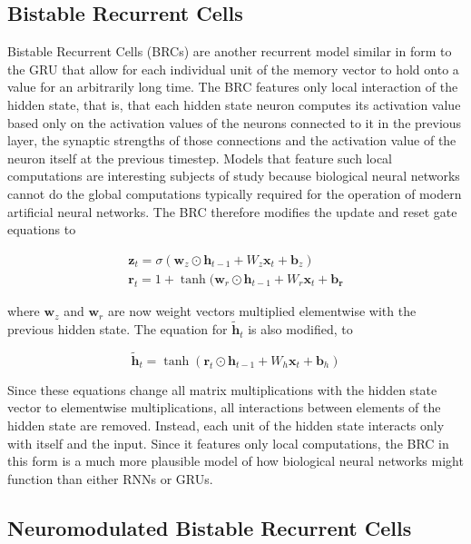 \subsection*{Bistable Recurrent Cells}

 Bistable Recurrent Cells (BRCs) \cite{vecoven2021brc} are another recurrent model similar in form to the GRU that allow for each individual unit of the memory vector to hold onto a value for an arbitrarily long time. The BRC features only local interaction of the hidden state, that is, that each hidden state neuron computes its activation value based only on the activation values of the neurons connected to it in the previous layer, the synaptic strengths of those connections and the activation value of the neuron itself at the previous timestep. Models that feature such local computations are interesting subjects of study because biological neural networks cannot do the global computations typically required for the operation of modern artificial neural networks. The BRC therefore modifies the update and reset gate equations to

\begin{gather*}
	\mathbf{z}_t = \sigma(\mathbf{w}_z \odot \mathbf{h}_{t-1} + W_z \mathbf{x}_t + \mathbf{b}_z)\\
	\mathbf{r}_t = 1 + \tanh(\mathbf{w}_r \odot \mathbf{h}_{t-1} + W_r \mathbf{x}_t + \mathbf{b_r}
\end{gather*}

where \(\mathbf{w}_z\) and \(\mathbf{w}_r\) are now weight vectors multiplied elementwise with the previous hidden state. The equation for \(\mathbf{\tilde{h}}_t\) is also modified, to

\[ \mathbf{\tilde{h}}_t = \tanh(\mathbf{r}_t \odot \mathbf{h}_{t-1} + W_h \mathbf{x}_t + \mathbf{b}_h) \]

Since these equations change all matrix multiplications with the hidden state vector to elementwise multiplications, all interactions between elements of the hidden state are removed. Instead, each unit of the hidden state interacts only with itself and the input. Since it features only local computations, the BRC in this form is a much more plausible model of how biological neural networks might function than either RNNs or GRUs.




\subsection*{Neuromodulated Bistable Recurrent Cells}

